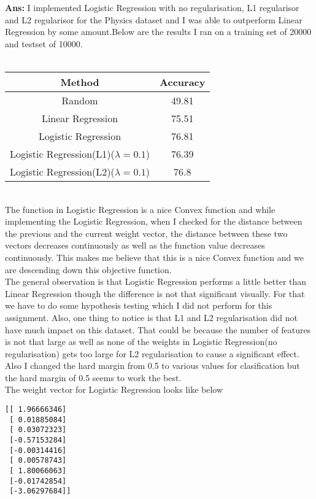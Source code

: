 \documentclass[11pt]{article}
\begin{document}
\textbf{Ans:} I implemented Logistic Regression with no regularisation, L1 regularisor and L2 regularisor for the Physics dataset and I was able to outperform Linear Regression by some amount.Below are the results I ran on a training set of 20000 and testset of 10000.\\
\vspace{0.3 cm}\\
\begin{tabular}{|c|c|}
\hline 
Method & Accuracy \\ 
\hline 
Random & 49.81 \\ 
\hline 
Linear Regression & 75.51 \\ 
\hline 
Logistic Regression & 76.81 \\ 
\hline 
Logistic Regression(L1)($\lambda=0.1$) & 76.39 \\ 
\hline 
Logistic Regression(L2)($\lambda=0.1$) & 76.8 \\ 
\hline 
\end{tabular}
\vspace{0.3 cm}\\
The function in Logistic Regression is a nice Convex function and while implementing the Logistic Regression, when I checked for the distance between the previous and the current weight vector, the distance between these two vectors decreases continuously as well as the function value decreases continuously. This makes me believe that this is a nice Convex function and we are descending down this objective function.\\

The general observation is that Logistic Regression performs a little better than Linear Regression though the difference is not that significant visually. For that we have to do some hypothesis testing which I did not perform for this assignment. Also, one thing to notice is that L1 and L2 regularisation did not have much impact on this dataset. That could be because the number of features is not that large as well as none of the weights in Logistic Regression(no regularisation) gets too large for L2 regularisation to cause a significant effect. Also I changed the hard margin from 0.5 to various values for clasification  but the hard margin of 0.5 seems to work the best. \\
The weight vector for Logistic Regression looks like below\\
\begin{verbatim}
[[ 1.96666346]
 [ 0.01885084]
 [ 0.03072323]
 [-0.57153284]
 [-0.00314416]
 [ 0.00578743]
 [ 1.80066063]
 [-0.01742854]
 [-3.06297684]]
\end{verbatim}
\end{document}
